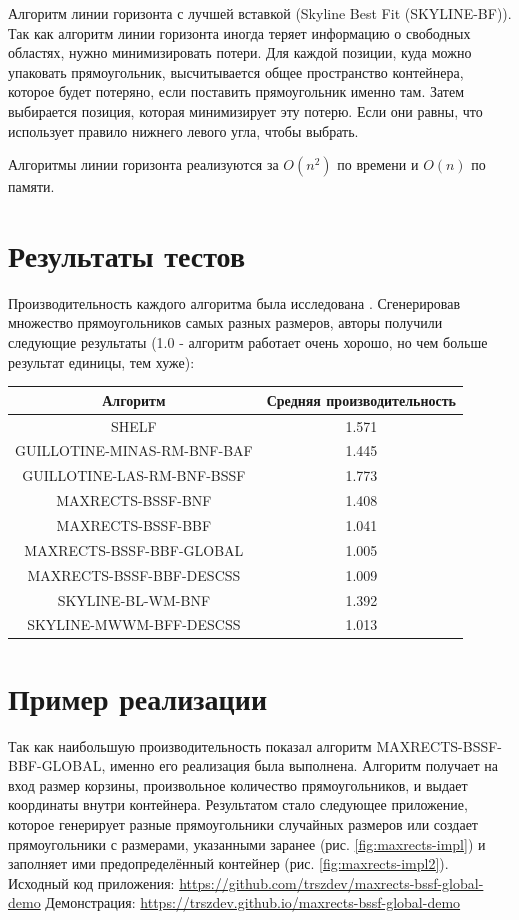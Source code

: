 \documentclass[a4paper,12pt]{report}
\begin{document}
Алгоритм линии горизонта с лучшей вставкой (Skyline Best Fit (SKYLINE-BF)). Так как алгоритм линии горизонта иногда теряет информацию о свободных областях, нужно минимизировать потери. Для каждой позиции, куда можно упаковать прямоугольник, высчитывается общее пространство контейнера, которое будет потеряно, если поставить прямоугольник именно там. Затем выбирается позиция, которая минимизирует эту потерю. Если они равны, что использует правило нижнего левого угла, чтобы выбрать.

Алгоритмы линии горизонта реализуются за $O(n^2)$ по времени и $O(n)$ по памяти.

\section{Результаты тестов}

Производительность каждого алгоритма была исследована \citep{Jylanki}. Сгенерировав множество прямоугольников самых разных размеров, авторы получили следующие результаты (1.0 - алгоритм работает очень хорошо, но чем больше результат единицы, тем хуже): 

\begin{center}
\begin{tabular}{ c|c }
 Алгоритм & Средняя производительность \\
 \hline
  SHELF & 1.571 \\ 
  GUILLOTINE-MINAS-RM-BNF-BAF & 1.445 \\ 
  GUILLOTINE-LAS-RM-BNF-BSSF & 1.773 \\
  MAXRECTS-BSSF-BNF & 1.408 \\
  MAXRECTS-BSSF-BBF & 1.041 \\
  MAXRECTS-BSSF-BBF-GLOBAL & 1.005 \\
  MAXRECTS-BSSF-BBF-DESCSS & 1.009 \\
  SKYLINE-BL-WM-BNF & 1.392 \\
  SKYLINE-MWWM-BFF-DESCSS & 1.013 \\
\end{tabular}
\end{center}

\section{Пример реализации}

Так как наибольшую производительность показал алгоритм MAXRECTS-BSSF-BBF-GLOBAL, именно его реализация была выполнена. Алгоритм получает на вход размер корзины, произвольное количество прямоугольников, и выдает координаты внутри контейнера. Результатом стало следующее приложение, которое генерирует разные прямоугольники случайных размеров или создает прямоугольники с размерами, указанными заранее (рис. \ref{fig:maxrects-impl}) и заполняет ими предопределённый контейнер (рис. \ref{fig:maxrects-impl2}).
\newline
\newline
Исходный код приложения: \url{https://github.com/trszdev/maxrects-bssf-global-demo}
\newline
Демонстрация: \url{https://trszdev.github.io/maxrects-bssf-global-demo}
\end{document}
